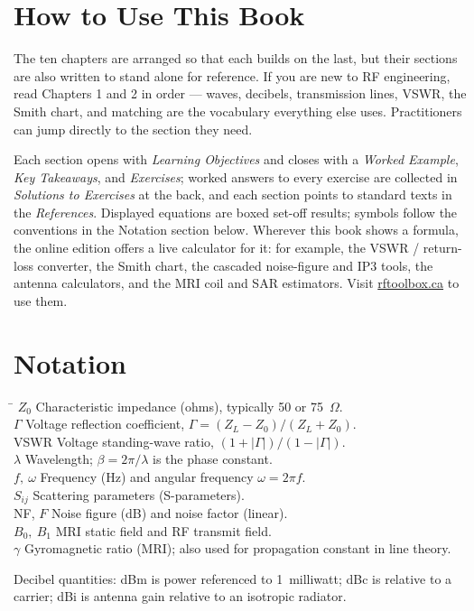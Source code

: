 \documentclass[11pt,openany]{book}
\begin{document}
\chapter*{How to Use This Book}
The ten chapters are arranged so that each builds on the last, but their sections
are also written to stand alone for reference. If you are new to RF engineering,
read Chapters 1 and 2 in order — waves, decibels, transmission lines, VSWR, the
Smith chart, and matching are the vocabulary everything else uses. Practitioners
can jump directly to the section they need.

Each section opens with \emph{Learning Objectives} and closes with a
\emph{Worked Example}, \emph{Key Takeaways}, and \emph{Exercises}; worked answers to
every exercise are collected in \emph{Solutions to Exercises} at the back, and each
section points to standard texts in the \emph{References}. Displayed equations are
boxed set-off results; symbols follow the conventions in the Notation section below. Wherever this book shows a formula, the online edition offers
a live calculator for it: for example, the VSWR / return-loss converter, the Smith
chart, the cascaded noise-figure and IP3 tools, the antenna calculators, and the MRI
coil and SAR estimators. Visit \href{https://rftoolbox.ca}{rftoolbox.ca} to use them.

\chapter*{Notation}
\begin{tabbing}
\hspace{3.2cm}\=\kill
$Z_0$ \> Characteristic impedance (ohms), typically 50 or 75~$\Omega$.\\
$\Gamma$ \> Voltage reflection coefficient, $\Gamma=(Z_L-Z_0)/(Z_L+Z_0)$.\\
VSWR \> Voltage standing-wave ratio, $(1+|\Gamma|)/(1-|\Gamma|)$.\\
$\lambda$ \> Wavelength; $\beta=2\pi/\lambda$ is the phase constant.\\
$f,\ \omega$ \> Frequency (Hz) and angular frequency $\omega=2\pi f$.\\
$S_{ij}$ \> Scattering parameters (S-parameters).\\
NF, $F$ \> Noise figure (dB) and noise factor (linear).\\
$B_0,\ B_1$ \> MRI static field and RF transmit field.\\
$\gamma$ \> Gyromagnetic ratio (MRI); also used for propagation constant in line theory.\\
\end{tabbing}
\noindent Decibel quantities: dBm is power referenced to 1~milliwatt; dBc is
relative to a carrier; dBi is antenna gain relative to an isotropic radiator.
\end{document}
